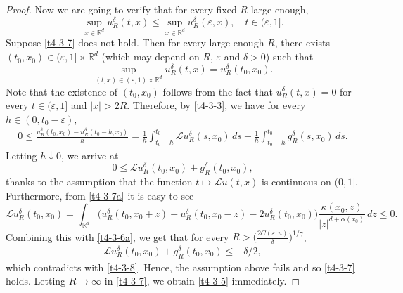 \documentclass[a4paper,11pt]{amsart}
\renewcommand{\le}{\leqslant}
\newcommand{\R}{\mathds R}
\newcommand{\K}{\kappa}
\newcommand{\A}{\alpha}
\newcommand{\G}{\gamma}
\newcommand{\e}{ \varepsilon}
\def\LL{{\mathcal L}}
\theoremstyle{definition}
\begin{document}
\begin{proof}
Now we are going to verify that for every fixed $R$ large enough,
\begin{equation}\label{t4-3-7}
\sup_{x \in \R^d}u_R^{\delta}(t,x)\le \sup_{x \in \R^d}u_R^{\delta}(\e,x),\quad t\in (\e,1].
\end{equation}
Suppose \eqref{t4-3-7} does not hold. Then for every large enough $R$, there exists
$(t_0,x_0) \in (\e,1]\times \R^d$ (which may depend on $R$, $\e$ and $\delta>0$) such that
\begin{equation}\label{t4-3-7a}
\sup_{(t,x) \in (\e,1)\times\R^d}u_R^{\delta}(t,x)=u_R^{\delta}(t_0,x_0).
\end{equation} Note that the existence of $(t_0,x_0)$ follows from the fact
that $u_R^{\delta}(t,x)=0$ for every $t \in (\e,1]$ and $|x|>2R$.
Therefore, by \eqref{t4-3-3}, we have for every $h \in (0,t_0-\e)$,
\begin{align*}
0\le \frac{u_R^{\delta}(t_0,x_0)-u_R^{\delta}(t_0-h,x_0)}{h}=
\frac{1}{h}\int_{t_0-h}^{t_0}  \LL u_R^{\delta}(s,x_0)\,ds+
\frac{1}{h}\int_{t_0-h}^{t_0}g_R^{\delta}(s,x_0)\,ds.
\end{align*}
Letting $h \downarrow 0$, we arrive at
\begin{equation}\label{t4-3-8}
0\le  \LL u_R^{\delta}(t_0,x_0)+g_R^{\delta}(t_0,x_0),
\end{equation} thanks to the assumption that the function $t \mapsto  \LL u(t,x)$ is continuous on $(0,1]$.
Furthermore, from \eqref{t4-3-7a} it is easy to see
\begin{equation*}
 \LL u_R^{\delta}(t_0,x_0)=\int_{\R^d}\big(u_R^{\delta}(t_0,x_0+z)+
u_R^{\delta}(t_0,x_0-z)-2u_R^{\delta}(t_0,x_0)\big)\frac{\K(x_0,z)}{|z|^{d+\A(x_0)}}\,dz\le 0.
\end{equation*}
Combining this with \eqref{t4-3-6a}, we get that for every $R>\big(\frac{2C(\e,u)}{\delta}\big)^{{1}/{\G}}$,
\begin{align*}
 \LL u_R^{\delta}(t_0,x_0)+g_R^{\delta}(t_0,x_0)\le -{\delta}/{2},
\end{align*}
which contradicts with \eqref{t4-3-8}.
Hence, the assumption above fails and so \eqref{t4-3-7} holds. Letting $R \rightarrow \infty$ in \eqref{t4-3-7},
we obtain \eqref{t4-3-5} immediately.
\end{proof}
\end{document}
